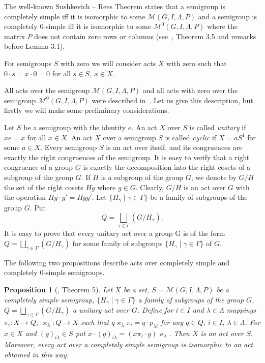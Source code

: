 \documentclass{birkau}
\numberwithin{equation}{section}
\theoremstyle{plain}
\newtheorem{proposition}[theorem]{Proposition}
\theoremstyle{definition}
\begin{document}
	The well-known Sushkevich -- Rees Theorem states that a semigroup is completely simple iff it is isomorphic to some $\mathcal{M}(G, I,\Lambda,P)$ and a semigroup is completely 0-simple iff it is isomorphic to some $\mathcal{M}^0(G,I,\Lambda,P)$ where the matrix $P$ does not contain zero rows or columns (see~\cite{cliff}, Theorem 3.5 and remarks before Lemma 3.1).
	
	For semigroups $S$ with zero we will consider acts $X$ with zero such that $0 \cdot s = x \cdot 0 = 0$ for all $s\in S,\ x\in X$.
	
	All acts over the semigroup $\mathcal{M}(G,I,\Lambda,P)$ and all acts with zero over the semigroup $\mathcal{M}^0(G,I,\Lambda,P)$ were described in~\cite{avdeev}. Let us give this description, but firstly we will make some preliminary considerations.
	
	Let $S$ be a semigroup with the identity $e$. An act $X$ over $S$ is called \textit{unitary} if $xe=x$ for all $x \in X$. An act $X$ over a semigroup $S$ is called \textit{cyclic} if $X=aS^1$ for some $a \in X$. Every semigroup $S$ is an act over itself, and its congruences are exactly the right congruences of the semigroup. It is easy to verify that a right congruence of a group $G$ is exactly the decomposition into the right cosets of a subgroup of the group $G$. If $H$ is a subgroup of the group $G$, we denote by $G/H$ the set of the right cosets $Hg$ where $g \in G$. Clearly, $G/H$ is an act over $G$ with the operation $Hg \cdot g' = Hgg'$. Let $\{ H_\gamma \mid \gamma \in \Gamma \} $ be a family of subgroups of the group $G$. Put $$ Q = \bigsqcup_{\gamma \in \Gamma} (G/H_\gamma). $$ It is easy to prove that every unitary act over a group G is of the form $ Q = \bigsqcup_{\gamma \in \Gamma} (G/H_\gamma) $ for some family of subgroups $\{ H_{\gamma} \mid \gamma \in \Gamma \}$ of $G$.
	
	The following two propositions describe acts over completely simple and completely 0-simple semigroups.
	
	\begin{proposition}[\cite{avdeev}, Theorem 5] \label{pr01}
	    Let $X$ be a set, $S=\mathcal{M}(G,I,\Lambda,P)$ be a completely simple semigroup, $\{ H_\gamma \mid \gamma \in \Gamma \}$ a family of subgroups of the group $G$, $ Q = \bigsqcup_{\gamma \in \Gamma} (G/H_\gamma) $ a unitary act over $G$. Define for $ i \in I$ and $\lambda \in \Lambda$  mappings $\pi_i:X \rightarrow Q$, $\varkappa_\lambda: Q \rightarrow X$ such that $q \varkappa_\lambda \pi_i = q \cdot p_{\lambda i}$ for any $q \in Q$, $i \in I$, $\lambda \in \Lambda$. For $x \in X$ and $(g)_{i \lambda} \in S$ put $x \cdot (g)_{i \lambda} = (x \pi_i \cdot g)\varkappa_{\lambda}$. Then $X$ is an act over $S$. Moreover, every act over a completely simple semigroup is isomorphic to an act obtained in this way.
	\end{proposition}
	
\end{document}
